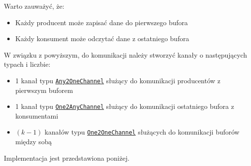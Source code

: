 \documentclass[11pt]{article}
\providecommand{\tightlist}{%
      \setlength{\itemsep}{0pt}\setlength{\parskip}{0pt}}
\begin{document}
Warto zauważyć, że:

\begin{itemize}
\tightlist
\item
  Każdy producent może zapisać dane do pierwszego bufora
\item
  Każdy konsument może odczytać dane z ostatniego bufora
\end{itemize}

W związku z powyższym, do komunikacji należy stworzyć kanały o
następujących typach i liczbie:

\begin{itemize}
\tightlist
\item
  1 kanał typu
  \href{https://www.cs.kent.ac.uk/projects/ofa/jcsp/jcsp-1.1-rc4/jcsp-doc/org/jcsp/lang/Channel.html\#any2one()}{\texttt{Any2OneChannel}}
  służący do komunikacji producentów z pierwszym buforem
\item
  1 kanał typu
  \href{https://www.cs.kent.ac.uk/projects/ofa/jcsp/jcsp-1.1-rc4/jcsp-doc/org/jcsp/lang/Channel.html\#one2any()}{\texttt{One2AnyChannel}}
  służący do komunikacji ostatniego bufora z konsumentami
\item
  \((k - 1)\) kanałów typu
  \href{https://www.cs.kent.ac.uk/projects/ofa/jcsp/jcsp-1.1-rc4/jcsp-doc/org/jcsp/lang/Channel.html\#one2one()}{\texttt{One2OneChannel}}
  służących do komunikacji buforów między sobą
\end{itemize}

Implementacja jest przedstawiona poniżej.
\end{document}
